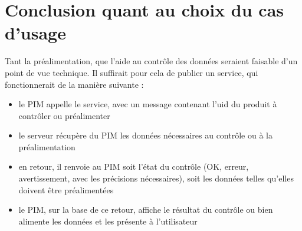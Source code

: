        \section{Conclusion quant au choix du cas d'usage}

        Tant la préalimentation, que l'aide au contrôle des données seraient faisable d'un point de vue technique.
        Il suffirait pour cela de publier un service, qui fonctionnerait de la manière suivante : 
        \begin{itemize}
            \item le PIM appelle le service, avec un message contenant l'uid du produit à contrôler ou préalimenter
            \item le serveur récupère du PIM les données nécessaires au contrôle ou à la préalimentation
            \item en retour, il renvoie au PIM soit l'état du contrôle (OK, erreur, avertissement, avec les précisions nécessaires), soit les données telles qu'elles doivent être préalimentées
            \item le PIM, sur la base de ce retour, affiche le résultat du contrôle ou bien alimente les données et les présente à l'utilisateur
        \end{itemize}

